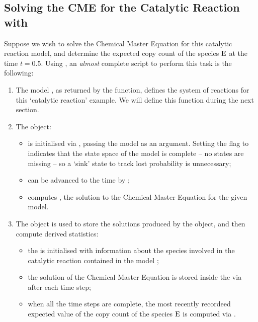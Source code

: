 \subsection{Solving the CME for the Catalytic Reaction with \cmepy{}}
Suppose we wish to solve the Chemical Master Equation for this catalytic
reaction model, and determine the expected copy count of the species
$ \textrm{{E}} $ at the time $t = 0.5$. Using \cmepy{}, an \emph{almost} complete
script to perform this task is the following:

\begin{enumerate}
  \item The model ,
  as returned by the 
  function,
  defines the system of reactions for this `catalytic
  reaction' example. We will define this function during the next section.
  \item The  object:
  \begin{itemize}
    \item is initialised via , passing the model
     as an argument.
    Setting the flag  to  indicates
    that the state space of the model is complete -- no
	states are missing -- so a `sink' state to track lost probability is
	unnecessary;
	\item can be advanced to the time  by ;
	\item computes , the solution to the Chemical Master Equation
	for the given model.
  \end{itemize}
  \item The  object is used to store the solutions produced by
  the  object, and then compute derived statistics:
  \begin{itemize}
    \item the  is initialised with information about the species
    involved in the catalytic reaction contained in the model ;
    \item the solution  of the Chemical Master Equation is
    stored inside the  via 
    after each time step;
    \item when all the time steps are complete, the most recently
    recordeed expected value of the copy count of the species $ \textrm{{E}} $ is
    computed via .
  \end{itemize}
\end{enumerate}
